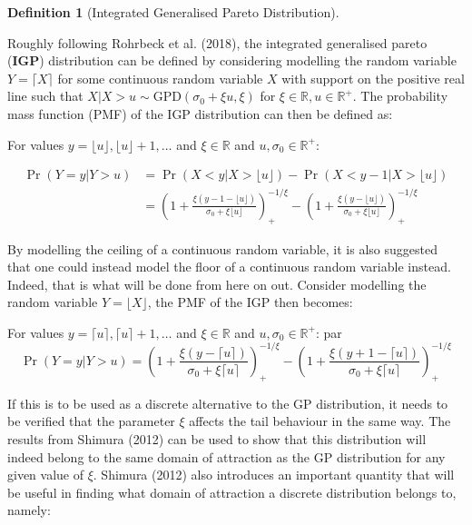 \documentclass[
  10pt,
  a4paper,
]{scrreprt}
\theoremstyle{definition}
\newtheorem{definition}{Definition}[section]
\theoremstyle{remark}
\begin{document}
{\begin{definition}[Integrated Generalised Pareto
Distribution]\protect\hypertarget{def-igp}{}\label{def-igp}

Roughly following Rohrbeck et al. (2018), the integrated generalised
pareto (\textbf{IGP}) distribution can be defined by considering
modelling the random variable \(Y = \lceil X\rceil\) for some continuous
random variable \(X\) with support on the positive real line such that
\(X|X>u \sim \text{GPD}(\sigma_0+\xi u, \xi)\) for
\(\xi\in\mathbb R,u\in\mathbb R^+\). The probability mass function (PMF)
of the IGP distribution can then be defined as:

For values \(y = \lfloor u \rfloor, \lfloor u \rfloor+1, \ldots\) and
\(\xi \in \mathbb R\) and \(u,\sigma_0 \in\mathbb R^+\):

\begin{align*}
\Pr(Y=y | Y>u) &= \Pr(X<y|X>\lfloor u\rfloor) - \Pr(X<y-1|X>\lfloor u\rfloor) \\
&=\left(1+\frac{\xi(y-1-\lfloor u\rfloor)}{\sigma_0 + \xi \lfloor u \rfloor}\right)_+^{-1/\xi} - \left(1+\frac{\xi(y-\lfloor u\rfloor)}{\sigma_0 + \xi \lfloor u \rfloor}\right)_+^{-1/\xi}
\end{align*}

By modelling the ceiling of a continuous random variable, it is also
suggested that one could instead model the floor of a continuous random
variable instead. Indeed, that is what will be done from here on out.
Consider modelling the random variable \(Y=\lfloor X\rfloor\), the PMF
of the IGP then becomes:

For values \(y=\lceil u \rceil,\lceil u \rceil +1,\ldots\) and
\(\xi \in \mathbb R\) and \(u,\sigma_0 \in\mathbb R^+\): par\[
\Pr(Y=y | Y>u) = \left(1+\frac{\xi(y-\lceil u\rceil)}{\sigma_0 + \xi \lceil u \rceil}\right)_+^{-1/\xi} - \left(1+\frac{\xi(y+1-\lceil u\rceil)}{\sigma_0 + \xi \lceil u \rceil}\right)_+^{-1/\xi}
\]

\end{definition}

If this is to be used as a discrete alternative to the GP distribution,
it needs to be verified that the parameter \(\xi\) affects the tail
behaviour in the same way. The results from Shimura (2012) can be used
to show that this distribution will indeed belong to the same domain of
attraction as the GP distribution for any given value of \(\xi\).
Shimura (2012) also introduces an important quantity that will be useful
in finding what domain of attraction a discrete distribution belongs to,
namely:

}
\end{document}
